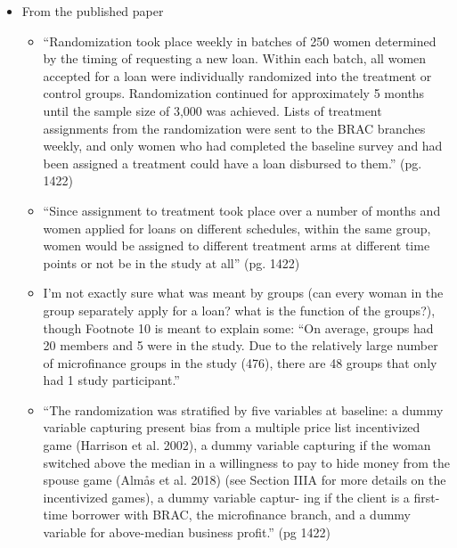 \documentclass[]{article}
\begin{document}
\begin{itemize}
\begin{itemize}
\begin{itemize}
		\end{itemize}
	\end{itemize}
		\item From the published paper
		\begin{itemize}
			\item ``Randomization took place weekly in batches of 250 women determined by the timing of requesting a new loan. Within each batch, all women accepted for a loan were individually randomized into the treatment or control groups. Randomization continued for approximately 5 months until the sample size of 3,000 was achieved. Lists of treatment assignments from the randomization were sent to the BRAC branches weekly, and only women who had completed the baseline survey and had been assigned a treatment could have a loan disbursed to them.'' (pg. 1422)
			\item ``Since assignment to treatment took place over a number of months and women applied for loans on different schedules, within the same group, women would be assigned to different treatment arms at different time points or not be in the study at all'' (pg. 1422) 
			\item I'm not exactly sure what was meant by groups (can every woman in the group separately apply for a loan? what is the function of the groups?), though Footnote 10 is meant to explain some: ``On average, groups had 20 members and 5 were in the study. Due to the relatively large number of microfinance groups in the study (476), there are 48 groups that only had 1 study participant.''
			\item ``The randomization was stratified by five variables at baseline: a dummy variable capturing present bias from a multiple price list incentivized game (Harrison et al. 2002), a dummy variable capturing if the woman switched above the median in a willingness to pay to hide money from the spouse game (Almås et al. 2018) (see Section IIIA for more details on the incentivized games), a dummy variable captur- ing if the client is a first-time borrower with BRAC, the microfinance branch, and a dummy variable for above-median business profit.'' (pg 1422)
		\end{itemize}
\end{itemize}
\end{document}
